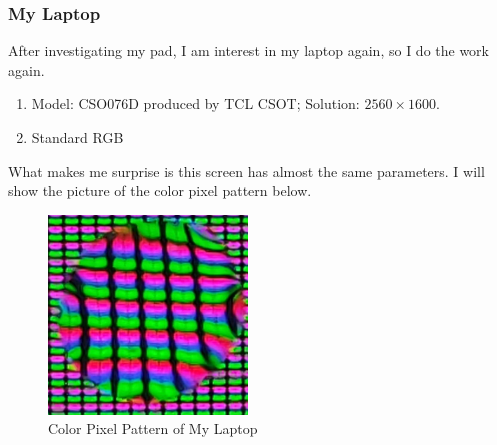 \documentclass{article}
\begin{document}
\subsubsection{My Laptop}
After investigating my pad, I am interest in my laptop again, so I do the work again.
\begin{enumerate}
    \item Model: CSO076D produced by TCL CSOT; Solution: $2560\times1600$.
    \item Standard RGB
\end{enumerate}

What makes me surprise is this screen has almost the same parameters. I will show the picture of the color pixel pattern below.

\begin{figure}[htbp]
    \centering
    \includegraphics[keepaspectratio,width=150pt]{pixel2.jpg}
    \caption{Color Pixel Pattern of My Laptop}
\end{figure}





\end{document}

